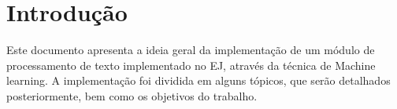 \chapter*[Introdução]{Introdução}

Este documento apresenta a ideia geral da implementação de um módulo de processamento de texto implementado no EJ, através da técnica de Machine learning. A implementação foi dividida em alguns tópicos, que serão detalhados posteriormente, bem como os objetivos do trabalho.
